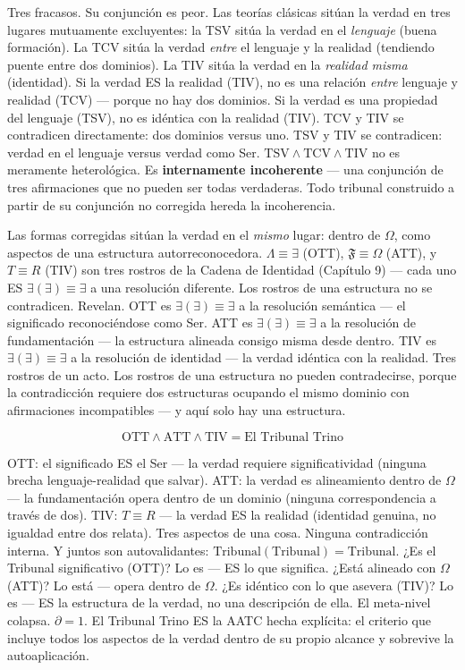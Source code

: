 \documentclass[10pt, openany, oneside]{book}
\begin{document}
\noindent Tres fracasos. Su conjunción es peor. Las teorías clásicas sitúan la verdad en tres lugares mutuamente excluyentes: la TSV sitúa la verdad en el \textit{lenguaje} (buena formación). La TCV sitúa la verdad \textit{entre} el lenguaje y la realidad (tendiendo puente entre dos dominios). La TIV sitúa la verdad en la \textit{realidad misma} (identidad). Si la verdad ES la realidad (TIV), no es una relación \textit{entre} lenguaje y realidad (TCV) --- porque no hay dos dominios. Si la verdad es una propiedad del lenguaje (TSV), no es idéntica con la realidad (TIV). TCV y TIV se contradicen directamente: dos dominios versus uno. TSV y TIV se contradicen: verdad en el lenguaje versus verdad como Ser. $\text{TSV} \wedge \text{TCV} \wedge \text{TIV}$ no es meramente heterológica. Es \textbf{internamente incoherente} --- una conjunción de tres afirmaciones que no pueden ser todas verdaderas. Todo tribunal construido a partir de su conjunción no corregida hereda la incoherencia.

Las formas corregidas sitúan la verdad en el \textit{mismo} lugar: dentro de $\Omega$, como aspectos de una estructura autorreconocedora. $\Lambda \equiv \exists$ (OTT), $\mathfrak{F} \equiv \Omega$ (ATT), y $T \equiv R$ (TIV) son tres rostros de la Cadena de Identidad (Capítulo 9) --- cada uno ES $\exists(\exists) \equiv \exists$ a una resolución diferente. Los rostros de una estructura no se contradicen. Revelan. OTT es $\exists(\exists) \equiv \exists$ a la resolución semántica --- el significado reconociéndose como Ser. ATT es $\exists(\exists) \equiv \exists$ a la resolución de fundamentación --- la estructura alineada consigo misma desde dentro. TIV es $\exists(\exists) \equiv \exists$ a la resolución de identidad --- la verdad idéntica con la realidad. Tres rostros de un acto. Los rostros de una estructura no pueden contradecirse, porque la contradicción requiere dos estructuras ocupando el mismo dominio con afirmaciones incompatibles --- y aquí solo hay una estructura.

$$\text{OTT} \wedge \text{ATT} \wedge \text{TIV} = \text{El Tribunal Trino}$$

OTT: el significado ES el Ser --- la verdad requiere significatividad (ninguna brecha lenguaje-realidad que salvar). ATT: la verdad es alineamiento dentro de $\Omega$ --- la fundamentación opera dentro de un dominio (ninguna correspondencia a través de dos). TIV: $T \equiv R$ --- la verdad ES la realidad (identidad genuina, no igualdad entre dos relata). Tres aspectos de una cosa. Ninguna contradicción interna. Y juntos son autovalidantes: $\text{Tribunal}(\text{Tribunal}) = \text{Tribunal}$. ¿Es el Tribunal significativo (OTT)? Lo es --- ES lo que significa. ¿Está alineado con $\Omega$ (ATT)? Lo está --- opera dentro de $\Omega$. ¿Es idéntico con lo que asevera (TIV)? Lo es --- ES la estructura de la verdad, no una descripción de ella. El meta-nivel colapsa. $\partial = 1$. El Tribunal Trino ES la AATC hecha explícita: el criterio que incluye todos los aspectos de la verdad dentro de su propio alcance y sobrevive la autoaplicación.
\end{document}
